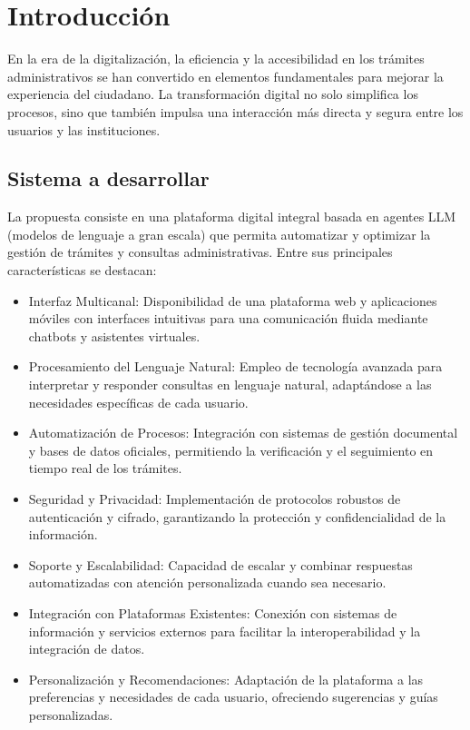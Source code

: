\section{Introducción}
En la era de la digitalización, la eficiencia y la accesibilidad en los trámites administrativos se han convertido en elementos fundamentales para mejorar la experiencia del ciudadano. La transformación digital no solo simplifica los procesos, sino que también impulsa una interacción más directa y segura entre los usuarios y las instituciones.

\subsection{Sistema a desarrollar}
La propuesta consiste en una plataforma digital integral basada en agentes LLM (modelos de lenguaje a gran escala) que permita automatizar y optimizar la gestión de trámites y consultas administrativas. Entre sus principales características se destacan:

\begin{itemize}
    \item Interfaz Multicanal: Disponibilidad de una plataforma web y aplicaciones móviles con interfaces intuitivas para una comunicación fluida mediante chatbots y asistentes virtuales.
    \item Procesamiento del Lenguaje Natural: Empleo de tecnología avanzada para interpretar y responder consultas en lenguaje natural, adaptándose a las necesidades específicas de cada usuario.
    \item Automatización de Procesos: Integración con sistemas de gestión documental y bases de datos oficiales, permitiendo la verificación y el seguimiento en tiempo real de los trámites.
    \item Seguridad y Privacidad: Implementación de protocolos robustos de autenticación y cifrado, garantizando la protección y confidencialidad de la información.
    \item Soporte y Escalabilidad: Capacidad de escalar y combinar respuestas automatizadas con atención personalizada cuando sea necesario.
    \item Integración con Plataformas Existentes: Conexión con sistemas de información y servicios externos para facilitar la interoperabilidad y la integración de datos.
    \item Personalización y Recomendaciones: Adaptación de la plataforma a las preferencias y necesidades de cada usuario, ofreciendo sugerencias y guías personalizadas.
\end{itemize}

